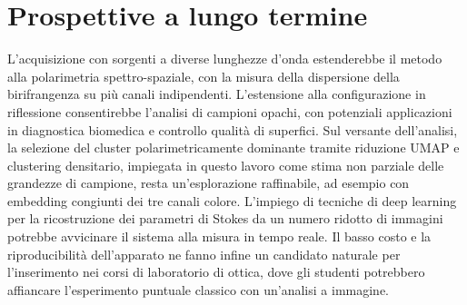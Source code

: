 \section{Prospettive a lungo termine}
\label{sec:sviluppi_lungo}

L'acquisizione con sorgenti a diverse lunghezze d'onda estenderebbe il metodo alla polarimetria spettro-spaziale, con la misura della dispersione della birifrangenza su più canali indipendenti. L'estensione alla configurazione in riflessione consentirebbe l'analisi di campioni opachi, con potenziali applicazioni in diagnostica biomedica e controllo qualità di superfici. Sul versante dell'analisi, la selezione del cluster polarimetricamente dominante tramite riduzione UMAP e clustering densitario, impiegata in questo lavoro come stima non parziale delle grandezze di campione, resta un'esplorazione raffinabile, ad esempio con embedding congiunti dei tre canali colore. L'impiego di tecniche di deep learning per la ricostruzione dei parametri di Stokes da un numero ridotto di immagini potrebbe avvicinare il sistema alla misura in tempo reale. Il basso costo e la riproducibilità dell'apparato ne fanno infine un candidato naturale per l'inserimento nei corsi di laboratorio di ottica, dove gli studenti potrebbero affiancare l'esperimento puntuale classico con un'analisi a immagine.
